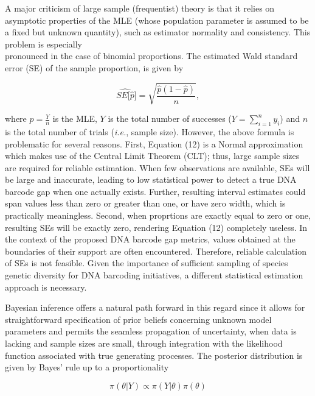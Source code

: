 \documentclass[12pt]{article}
\begin{document}
A major criticism of large sample (frequentist) theory is that it relies on asymptotic properties of the MLE (whose population parameter is assumed to be a fixed but unknown quantity), such as estimator normality and consistency. This problem is especially \\ pronounced in the case of binomial proportions. The estimated Wald standard error (SE) of the sample proportion, is given by 

\begin{equation}
\widehat{SE[\hat{p}}] = \sqrt{\frac{\hat{p}(1 - \hat{p})}{n}},
\end{equation}

\noindent where $\hat{p} = \frac{Y}{n}$ is the MLE, $Y$ is the total number of successes ($Y = \sum_{i=1}^n{y_i}$) and $n$ is the total number of trials (\textit{i.e.}, sample size). However, the above formula is problematic for several reasons. First, Equation (12) is a Normal approximation which makes use of the Central Limit Theorem (CLT); thus, large sample sizes are required for reliable estimation. When few observations are available, SEs will be large and inaccurate, leading to low statistical power to detect a true DNA barcode gap when one actually exists. Further, resulting interval estimates could span values less than zero or greater than one, or have zero width, which is practically meaningless. Second, when proprtions are exactly equal to zero or one, resulting SEs will be exactly zero, rendering Equation (12) completely useless. In the context of the proposed DNA barcode gap metrics, values obtained at the boundaries of their support are often encountered. Therefore, reliable calculation of SEs is not feasible. Given the importance of sufficient sampling of species genetic diversity for DNA barcoding initiatives, a different statistical estimation approach is necessary. 

Bayesian inference offers a natural path forward in this regard since it allows for \\ straightforward specification of prior beliefs concerning unknown model parameters and permits the seamless propagation of uncertainty, when data is lacking and sample sizes are small, through integration with the likelihood function associated with true generating processes. The posterior distribution is given by Bayes' rule up to a proportionality

\begin{equation}
\pi(\theta | Y) \propto \pi(Y | \theta)\pi(\theta)
\end{equation}
\end{document}
